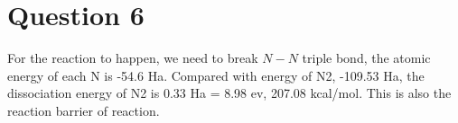 \documentclass{article}
\begin{document}
\section{Question 6}

For the reaction to happen, we need to break $N-N$ triple bond, the atomic energy of each N is -54.6 Ha. Compared with energy of N2, -109.53 Ha, the dissociation energy of N2 is 0.33 Ha = 8.98 ev, 207.08 kcal/mol. This is also the reaction barrier of reaction. 







\end{document}
